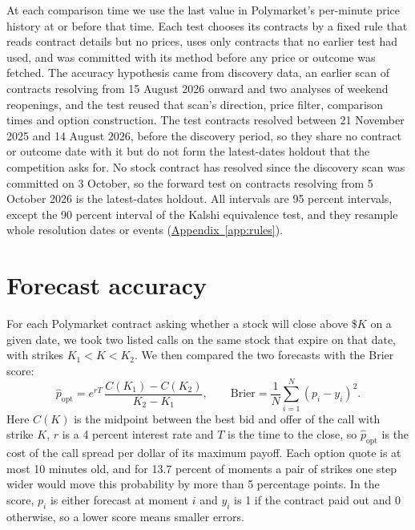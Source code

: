 \documentclass[11pt]{article}
\newcommand{\lref}[2]{\hyperref[#2]{#1~\ref*{#2}}}
\begin{document}
At each comparison time we use the last value in Polymarket's per-minute price history at or before that time. Each test chooses its contracts by a fixed rule that reads contract details but no prices, uses only contracts that no earlier test had used, and was committed with its method before any price or outcome was fetched. The accuracy hypothesis came from discovery data, an earlier scan of contracts resolving from 15 August 2026 onward and two analyses of weekend reopenings, and the test reused that scan's direction, price filter, comparison times and option construction. The test contracts resolved between 21 November 2025 and 14 August 2026, before the discovery period, so they share no contract or outcome date with it but do not form the latest-dates holdout that the competition asks for. No stock contract has resolved since the discovery scan was committed on 3 October, so the forward test on contracts resolving from 5 October 2026 is the latest-dates holdout. All intervals are 95 percent intervals, except the 90 percent interval of the Kalshi equivalence test, and they resample whole resolution dates or events (\lref{Appendix}{app:rules}).

\section{Forecast accuracy}\label{sec:acc}
For each Polymarket contract asking whether a stock will close above \$$K$ on a given date, we took two listed calls on the same stock that expire on that date, with strikes $K_1 < K < K_2$. We then compared the two forecasts with the Brier score:
\begin{equation}
\hat p_{\mathrm{opt}} = e^{rT}\,\frac{C(K_1) - C(K_2)}{K_2 - K_1}, \qquad \mathrm{Brier} = \frac{1}{N}\sum_{i=1}^{N} \left(p_i - y_i\right)^2 .
\label{eq:main}
\end{equation}
Here $C(K)$ is the midpoint between the best bid and offer of the call with strike $K$, $r$ is a 4 percent interest rate and $T$ is the time to the close, so $\hat p_{\mathrm{opt}}$ is the cost of the call spread per dollar of its maximum payoff. Each option quote is at most 10 minutes old, and for 13.7 percent of moments a pair of strikes one step wider would move this probability by more than 5 percentage points. In the score, $p_i$ is either forecast at moment $i$ and $y_i$ is 1 if the contract paid out and 0 otherwise, so a lower score means smaller errors.
\end{document}
